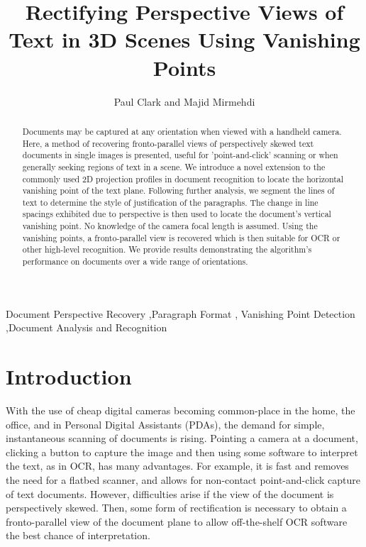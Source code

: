 \documentclass{elsart}   %
\begin{document}
\begin{frontmatter}

\title{Rectifying Perspective Views of Text in 3D Scenes Using Vanishing Points}

\author{Paul Clark and Majid Mirmehdi}  %

\address{
Department of Computer Science, University of Bristol, Bristol BS8 1UB, UK %
}

\begin{abstract}
Documents may be captured at any orientation when viewed with a handheld camera.
Here, a method of recovering  fronto-parallel views of perspectively skewed text
documents in single images is presented, useful for 'point-and-click' scanning
or when generally seeking regions of text in a scene.  We introduce a novel
extension to the commonly used 2D projection profiles in document recognition to
locate the horizontal vanishing point of the text plane.  Following further
analysis, we segment the lines of text to determine the style of justification
of the paragraphs.  The change in line spacings exhibited due to perspective is
then used to locate the document's vertical vanishing point. No knowledge of the
camera focal length is assumed. Using the vanishing points, a fronto-parallel
view is recovered which is then suitable for OCR or other high-level
recognition.  We provide results demonstrating the algorithm's performance on
documents over a wide range of orientations.
\end{abstract}

\begin{keyword}
Document Perspective Recovery  \sep Paragraph Format \sep 
Vanishing Point Detection \sep Document Analysis and Recognition 
\end{keyword}
\end{frontmatter}

\baselineskip 24pt


\section{Introduction}
With the use of cheap digital cameras becoming common-place in the
home, the office, and in Personal Digital Assistants (PDAs), the demand for
simple, instantaneous scanning of documents is rising. Pointing a camera at a
document, clicking a button to capture the image and then using some software to
interpret the text, as in OCR, has many advantages. For example, it is fast and
removes the need for a flatbed scanner, and allows for non-contact
point-and-click capture of text documents. However, difficulties arise if the
view of the document is perspectively skewed. Then, some form of rectification
is necessary to obtain a fronto-parallel view of the document plane to allow
off-the-shelf OCR software the best chance of interpretation.
\end{document}
